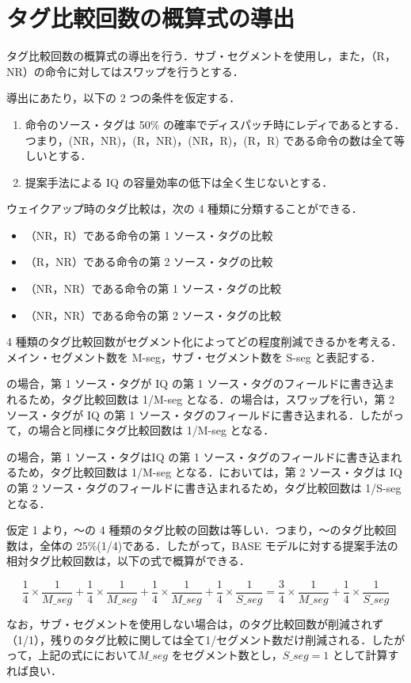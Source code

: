 
\chapter{タグ比較回数の概算式の導出}
\label{sec:appendix1}

タグ比較回数の概算式の導出を行う．サブ・セグメントを使用し，また，（R，NR）の命令に対してはスワップを行うとする．

導出にあたり，以下の 2 つの条件を仮定する．
\begin{enumerate}
  \item 命令のソース・タグは 50\% の確率でディスパッチ時にレディであるとする．つまり，(NR，NR)，(R，NR)，(NR，R)，(R，R) である命令の数は全て等しいとする．
  \item 提案手法による IQ の容量効率の低下は全く生じないとする．
\end{enumerate}

ウェイクアップ時のタグ比較は，次の 4 種類に分類することができる．
\begin{itemize}
  \item {}（NR，R）である命令の第 1 ソース・タグの比較
  \item {}（R，NR）である命令の第 2 ソース・タグの比較
  \item {}（NR，NR）である命令の第 1 ソース・タグの比較
  \item {}（NR，NR）である命令の第 2 ソース・タグの比較
\end{itemize}

4 種類のタグ比較回数がセグメント化によってどの程度削減できるかを考える．メイン・セグメント数を M-seg，サブ・セグメント数を S-seg と表記する．

の場合，第 1 ソース・タグが IQ の第 1 ソース・タグのフィールドに書き込まれるため，タグ比較回数は 1/M-seg となる．の場合は，スワップを行い，第 2 ソース・タグが IQ の第 1 ソース・タグのフィールドに書き込まれる．したがって，の場合と同様にタグ比較回数は 1/M-seg となる．

の場合，第 1 ソース・タグはIQ の第 1 ソース・タグのフィールドに書き込まれるため，タグ比較回数は 1/M-seg となる．においては，第 2 ソース・タグは IQ の第 2 ソース・タグのフィールドに書き込まれるため，タグ比較回数は 1/S-seg となる．

仮定 1 より，〜の 4 種類のタグ比較の回数は等しい．つまり，〜のタグ比較回数は，全体の 25\%(1/4)である．したがって，BASE モデルに対する提案手法の相対タグ比較回数は，以下の式で概算ができる．

\[
  \frac{1}{4}\times\frac{1}{M\_seg} + \frac{1}{4}\times\frac{1}{M\_seg} + \frac{1}{4}\times\frac{1}{M\_seg} + \frac{1}{4}\times\frac{1}{S\_seg}
  = \frac{3}{4}\times\frac{1}{M\_seg} + \frac{1}{4}\times\frac{1}{S\_seg}
\]

なお，サブ・セグメントを使用しない場合は，のタグ比較回数が削減されず（1/1），残りのタグ比較に関しては全て1/セグメント数だけ削減される．したがって，上記の式ににおいて$M\_seg$ をセグメント数とし，$S\_seg=1$ として計算すれば良い．